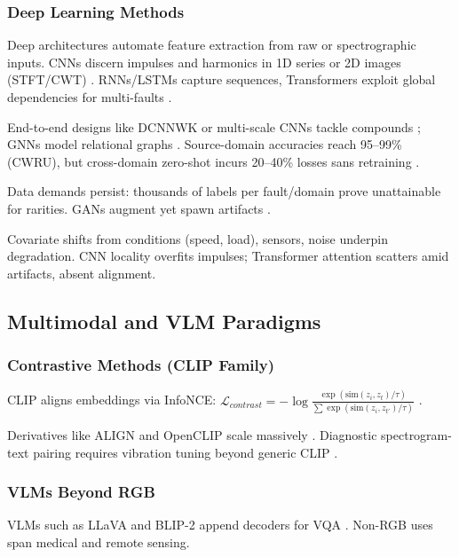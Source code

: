 \subsubsection{Deep Learning Methods}

Deep architectures automate feature extraction from raw or spectrographic inputs. CNNs discern impulses and harmonics in 1D series or 2D images (STFT/CWT) \cite{jia2016deep,verstraete2020cnn}. RNNs/LSTMs capture sequences, Transformers exploit global dependencies for multi-faults \cite{li2022transformer}.

End-to-end designs like DCNNWK or multi-scale CNNs tackle compounds \cite{wen2022maml}; GNNs model relational graphs \cite{li2023gnn}. Source-domain accuracies reach 95--99\% (CWRU), but cross-domain zero-shot incurs 20--40\% losses sans retraining \cite{wang2020transfer,hoang2023vit}.

Data demands persist: thousands of labels per fault/domain prove unattainable for rarities. GANs augment yet spawn artifacts \cite{hoang2023vit}.

Covariate shifts from conditions (speed, load), sensors, noise underpin degradation. CNN locality overfits impulses; Transformer attention scatters amid artifacts, absent alignment.

\subsection{Multimodal and VLM Paradigms}
\subsubsection{Contrastive Methods (CLIP Family)}

CLIP aligns embeddings via InfoNCE: $\mathcal{L}_{contrast} = -\log \frac{\exp(\mathrm{sim}(z_i, z_t)/\tau)}{\sum \exp(\mathrm{sim}(z_i, z_{t'})/\tau)}$ \cite{radford2021clip}.

Derivatives like ALIGN and OpenCLIP scale massively \cite{li2023align,jia2021scaling}. Diagnostic spectrogram-text pairing requires vibration tuning beyond generic CLIP \cite{kim2025llmzs}.

\subsubsection{VLMs Beyond RGB}

VLMs such as LLaVA and BLIP-2 append decoders for VQA \cite{liu2023llava}. Non-RGB uses span medical and remote sensing.

